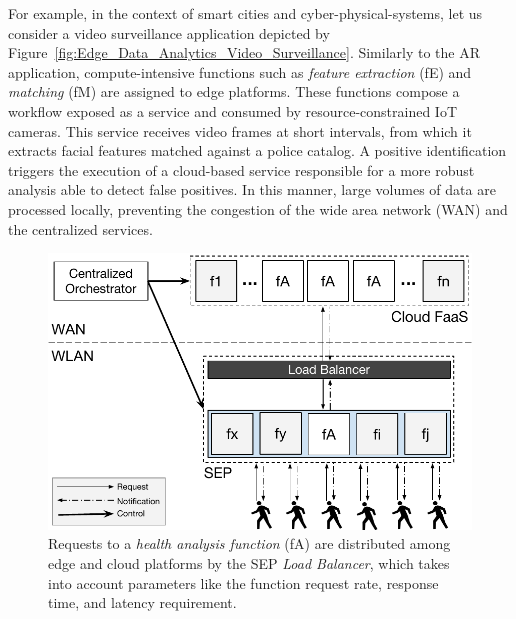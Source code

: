 \documentclass[letterpaper, 10 pt, conference]{ieeeconf}  %
\begin{document}

For example, in the context of smart cities and cyber-physical-systems, let us consider a video surveillance application depicted by Figure~\ref{fig:Edge_Data_Analytics_Video_Surveillance}. Similarly to the AR application, compute-intensive functions such as \textit{feature extraction} (fE) and \textit{matching} (fM) are assigned to edge platforms.
These functions compose a workflow exposed as a service and consumed by resource-constrained IoT cameras. This service receives video frames at short intervals, from which it extracts facial features matched against a police catalog. A positive identification triggers the execution of a cloud-based service responsible for a more robust analysis able to detect false positives. In this manner, large volumes of data are processed locally, preventing the congestion of the wide area network (WAN) and the centralized services.

\begin{figure}[tbp]
	\centering
	\includegraphics[width=\linewidth]{Figs/Edge_Data_Analytics_Personal_Assistant.pdf}
	\caption{Requests to a \textit{health analysis function} (fA) are distributed among edge and cloud platforms by the SEP \textit{Load Balancer}, which takes into account parameters like the function request rate, response time, and latency requirement.} 
	\label{fig:Edge_Data_Analytics_Personal_Assistant}
\end{figure}
\end{document}
